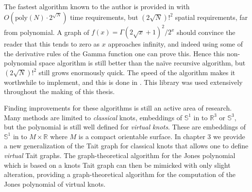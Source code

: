     The fastest algorithm known to the author is provided in
    \cite{Burton2018HOMFLFixedParameter} with
    $O(\textrm{poly}(N)\cdot{2}^{\sqrt{N}})$ time requirements, but
    $(2\sqrt{N})!^{2}$ spatial requirements, far from polynomial. A graph of
    $f(x)=\Gamma(2\sqrt{x}+1)^{2}/2^{x}$ should convince the reader that this
    tends to zero as $x$ approaches infinity, and indeed using some of the
    derivative rules of the Gamma function one can prove this. Hence this
    non-polynomial space algorithm is still better than the na\"{i}ve recursive
    algorithm, but $(2\sqrt{N})!^{2}$ still grows enormously quick. The
    speed of the algorithm makes it worthwhile to implement, and this is
    done in \cite{regina}. This library was used extensively throughout the
    making of this thesis.
    \par\hfill\par
    Finding improvements for these algorithms is still an active area of
    research. Many methods are limited to
    \textit{classical} knots, embeddings of
    $\mathbb{S}^{1}$ in to $\mathbb{R}^{3}$ or $\mathbb{S}^{3}$, but the
    polynomial is still well defined for \textit{virtual knots}. These are
    embeddings of $\mathbb{S}^{1}$ in to $M\times\mathbb{R}$ where $M$ is a
    compact orientable surface. In chapter 3 we provide a new generalization
    of the Tait graph for classical knots that allows one to define
    \textit{virtual} Tait graphs. The graph-theoretical algorithm for the
    Jones polynomial which is based on a knots Tait graph can then be mimicked
    with only slight alteration, providing a graph-theoretical algorithm for
    the computation of the Jones polynomial of virtual knots.
